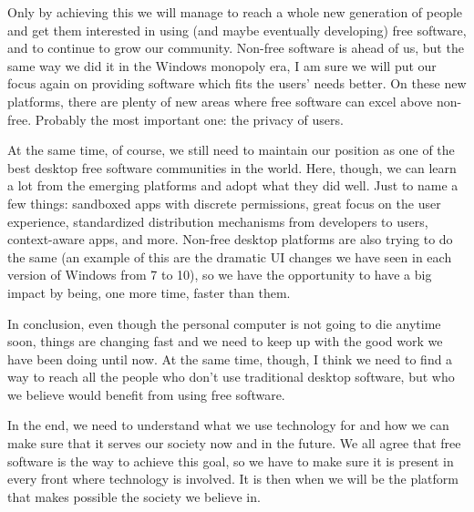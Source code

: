 Only by achieving this we will manage to reach a whole new generation of people and get them interested in using (and maybe eventually developing) free software, and to continue to grow our community. Non-free software is ahead of us, but the same way we did it in the Windows monopoly era, I am sure we will put our focus again on providing software which fits the users’ needs better. On these new platforms, there are plenty of new areas where free software can excel above non-free. Probably the most important one: the privacy of users.

At the same time, of course, we still need to maintain our position as one of the best desktop free software communities in the world. Here, though, we can learn a lot from the emerging platforms and adopt what they did well. Just to name a few things: sandboxed apps with discrete permissions, great focus on the user experience, standardized distribution mechanisms from developers to users, context-aware apps, and more. Non-free desktop platforms are also trying to do the same (an example of this are the dramatic UI changes we have seen in each version of Windows from 7 to 10), so we have the opportunity to have a big impact by being, one more time, faster than them.

In conclusion, even though the personal computer is not going to die anytime soon, things are changing fast and we need to keep up with the good work we have been doing until now. At the same time, though, I think we need to find a way to reach all the people who don't use traditional desktop software, but who we believe would benefit from using free software.

In the end, we need to understand what we use technology for and how we can make sure that it serves our society now and in the future. We all agree that free software is the way to achieve this goal, so we have to make sure it is present in every front where technology is involved. It is then when we will be the platform that makes possible the society we believe in.
